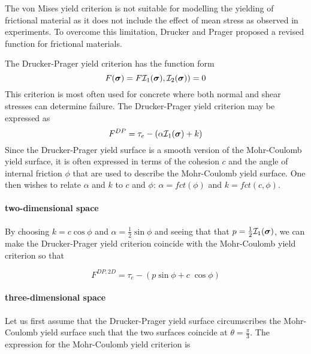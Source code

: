 The von Mises yield criterion is not suitable for modelling the yielding of frictional material 
as it does not include the effect of mean stress as observed in experiments. To overcome this 
limitation, Drucker and Prager \cite{drpr52} proposed a revised function for frictional materials.

The Drucker-Prager yield criterion has the function form
\begin{equation}
F({\bm \sigma})=F {\cal I}_1({\bm \sigma}), {\cal I}_2({\bm \sigma}) ) = 0 
\end{equation}
This criterion is most often used for concrete where both normal and shear stresses 
can determine failure. The Drucker-Prager yield criterion may be expressed as
\begin{equation}
F^{DP}=\tau_e - (\alpha {\cal I}_1({\bm \sigma}) + k) \label{dpcriterion} 
\end{equation}
Since the Drucker-Prager yield surface is a smooth version of the Mohr-Coulomb yield surface, it 
is often expressed in terms of the cohesion $c$ and the angle of internal friction $\phi$ that are used 
to describe the Mohr-Coulomb yield surface. One then wishes to relate $\alpha$ and $k$ to $c$ and $\phi$:
$\alpha= fct(\phi)$ and $k= fct(c,\phi) $.

\paragraph{two-dimensional space}

By choosing $k=c \cos \phi $ and $\alpha=\frac{1}{2}\sin \phi$ and seeing that that $p=\frac{1}{2} {\cal I}_1({\bm \sigma})$, we can make the Drucker-Prager yield criterion coincide with the Mohr-Coulomb yield criterion
so that 
\begin{mdframed}[backgroundcolor=blue!5]
\[
F^{DP,2D} = \tau_e - (p \sin \phi + c \; \cos \phi) 
\]
\end{mdframed}


\paragraph{three-dimensional space}

Let us first assume that the Drucker-Prager yield surface circumscribes the Mohr-Coulomb yield surface such that the two surfaces coincide at $\theta=\tfrac{\pi}{3}$. 
The expression for the Mohr-Coulomb yield criterion is

